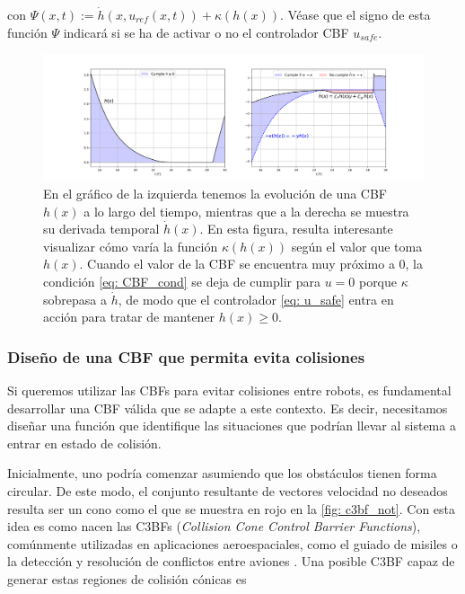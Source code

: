 con $\Psi(x,t) := \dot h (x, u_{ref}(x,t)) + \kappa(h(x))$. Véase que el signo de esta función $\Psi$ indicará si se ha de activar o no el controlador CBF $u_{safe}$.

\begin{figure}[h!]
    \centering
    \includegraphics[trim={0 0cm 0 0cm}, width=1\textwidth]{fig/CBF_1.png}
    \caption{En el gráfico de la izquierda tenemos la evolución de una CBF $h(x)$ a lo largo del tiempo, mientras que a la derecha se muestra su derivada temporal $\dot h(x)$. En esta figura, resulta interesante visualizar cómo varía la función $\kappa(h(x))$ según el valor que toma $h(x)$. Cuando el valor de la CBF se encuentra muy próximo a 0, la condición \eqref{eq: CBF_cond} se deja de cumplir para $u = 0$ porque $\kappa$ sobrepasa a $\dot h$, de modo que el controlador \eqref{eq: u_safe} entra en acción para tratar de mantener $h(x) \geq 0$.}
    \label{fig: cbf_show}
\end{figure}

\newpage

\subsubsection{Diseño de una CBF que permita evita colisiones}

Si queremos utilizar las CBFs para evitar colisiones entre robots, es fundamental desarrollar una CBF válida que se adapte a este contexto. Es decir, necesitamos diseñar una función que identifique las situaciones que podrían llevar al sistema a entrar en estado de colisión.


Inicialmente, uno podría comenzar asumiendo que los obstáculos tienen forma circular. De este modo, el conjunto resultante de vectores velocidad no deseados resulta ser un cono como el que se muestra en rojo en la \autoref{fig: c3bf_not}. Con esta idea es como nacen las C3BFs (\textit{Collision Cone Control Barrier Functions}), comúnmente utilizadas en aplicaciones aeroespaciales, como el guiado de misiles \cite{c3bfs_missile} o la detección y resolución de conflictos entre aviones \cite{c3bf_arigraft}. Una posible C3BF capaz de generar estas regiones de colisión cónicas es

